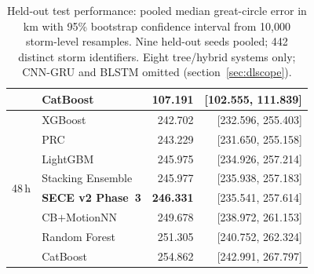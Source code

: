 \documentclass{ametsocv6.1}
\newcommand{\sece}{SECE}
\begin{document}
\begin{table}[ht]
\begin{tabular}{@{}llrr@{}}
 & CatBoost                    & 107.191 & [102.555, 111.839] \\
\midrule
\multirow{8}{*}{48\,h}
 & XGBoost                     & 242.702 & [232.596, 255.403] \\
 & PRC                         & 243.229 & [231.650, 255.158] \\
 & LightGBM                    & 245.975 & [234.926, 257.214] \\
 & Stacking Ensemble           & 245.977 & [235.938, 257.183] \\
 & \textbf{\sece{} v2 Phase~3} & \textbf{246.331} & [235.541, 257.614] \\
 & CB$+$MotionNN               & 249.678 & [238.972, 261.153] \\
 & Random Forest               & 251.305 & [240.752, 262.324] \\
 & CatBoost                    & 254.862 & [242.991, 267.797] \\
\bottomrule
\end{tabular}
\caption{Held-out test performance: pooled median great-circle error in km with
95\% bootstrap confidence interval from 10{,}000 storm-level resamples. Nine
held-out seeds pooled; 442 distinct storm identifiers. Eight tree/hybrid systems
only; CNN-GRU and BLSTM omitted (section~\ref{sec:dlscope}).}
\label{tab:heldout}
\end{table}
\end{document}
